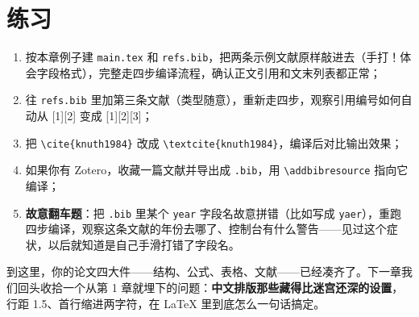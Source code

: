 \section*{练习}

\begin{enumerate}
\setlength{\itemsep}{2pt}
\item 按本章例子建 \texttt{main.tex} 和 \texttt{refs.bib}，把两条示例文献原样敲进去（手打！体会字段格式），完整走四步编译流程，确认正文引用和文末列表都正常；
\item 往 \texttt{refs.bib} 里加第三条文献（类型随意），重新走四步，观察引用编号如何自动从 [1][2] 变成 [1][2][3]；
\item 把 \texttt{\textbackslash{}cite\{knuth1984\}} 改成 \texttt{\textbackslash{}textcite\{knuth1984\}}，编译后对比输出效果；
\item 如果你有 Zotero，收藏一篇文献并导出成 \texttt{.bib}，用 \texttt{\textbackslash{}addbibresource} 指向它编译；
\item \textbf{故意翻车题}：把 \texttt{.bib} 里某个 \texttt{year} 字段名故意拼错（比如写成 \texttt{yaer}），重跑四步编译，观察这条文献的年份去哪了、控制台有什么警告——见过这个症状，以后就知道是自己手滑打错了字段名。
\end{enumerate}

到这里，你的论文四大件——结构、公式、表格、文献——已经凑齐了。下一章我们回头收拾一个从第 1 章就埋下的问题：\textbf{中文排版那些藏得比迷宫还深的设置}，行距 1.5、首行缩进两字符，在 LaTeX 里到底怎么一句话搞定。
